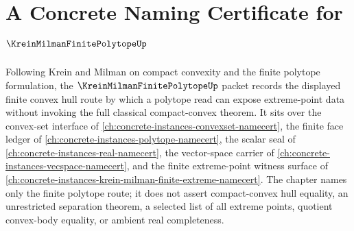 \chapter{A Concrete Naming Certificate for $\KreinMilmanFinitePolytopeUp$}
\label{ch:concrete-instances-krein-milman-finite-polytope-namecert}

Following Krein and Milman on compact convexity and the finite polytope formulation, the $\KreinMilmanFinitePolytopeUp$ packet records the displayed finite convex hull route by which a polytope read can expose extreme-point data without invoking the full classical compact-convex theorem. It sits over the convex-set interface of \autoref{ch:concrete-instances-convexset-namecert}, the finite face ledger of \autoref{ch:concrete-instances-polytope-namecert}, the scalar seal of \autoref{ch:concrete-instances-real-namecert}, the vector-space carrier of \autoref{ch:concrete-instances-vecspace-namecert}, and the finite extreme-point witness surface of \autoref{ch:concrete-instances-krein-milman-finite-extreme-namecert}. The chapter names only the finite polytope route; it does not assert compact-convex hull equality, an unrestricted separation theorem, a selected list of all extreme points, quotient convex-body equality, or ambient real completeness.

